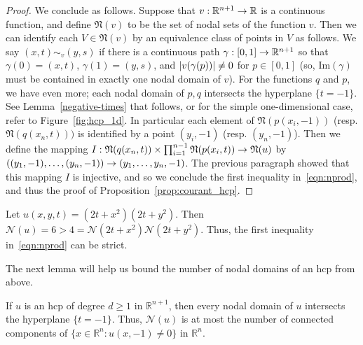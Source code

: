 \documentclass[AHL,Unicode,longabstracts,published]{cedram}
\newcommand{\R}{\mathbb{R}}
\newcommand{\ra}{\to}
\newcommand{\abs}[1]{\left \lvert #1 \right \rvert}
\renewcommand{\Im}{\mathrm{Im}}
\newcommand{\fkN}{\mathfrak{N}}
\newcommand{\nodal}{\mathcal{N}}
\renewcommand*{\to}{\mathchoice{\longrightarrow}{\rightarrow}{\rightarrow}{\rightarrow}}
\let\originalleft\left
\let\originalright\right
\renewcommand{\left}{\mathopen{}\mathclose\bgroup\originalleft}
\renewcommand{\right}{\aftergroup\egroup\originalright}
\newcommand{\R}{\mathbb{R}}
\begin{document}
\begin{proof}
{We conclude as follows. Suppose that $v:\R^{n+1} \ra \R$ is a continuous function, and define $\fkN(v)$ to be the set of nodal sets of the function $v$. Then we can identify each $V \in \fkN(v)$ by an equivalence class of points in $V$ as follows. We say $(x,t) \sim_v (y,s)$ if there is a continuous path $\gamma:[0,1] \ra \R^{n+1}$ so that $\gamma(0) = (x,t)$, $\gamma(1) = (y,s)$, and $\abs{v(\gamma(p))} \ne 0$ for $p \in [0,1]$ (so, $\Im(\gamma)$ must be contained in exactly one nodal domain of $v$). For the functions $q$ and $p$, we have even more; each nodal domain of $p, q$ intersects the hyperplane $\{t = -1\}$. See Lemma~\ref{negative-times} that follows, or for the simple one-dimensional case, refer to Figure~\ref{fig:hcp_1d}. In particular each element of $\fkN(p(x_i, -1))$ (resp. $\fkN(q(x_n, t)))$ is identified by a point $(y_i, -1)$ (resp. $(y_n, -1)$). Then we define the mapping $I: \fkN(q(x_n,t)) \times \prod_{i=1}^{n-1} \fkN(p(x_i, t)) \ra \fkN(u)$ by $((y_1, -1), \dots, (y_n, -1)) \ra (y_1, \dots, y_n, -1)$. The previous paragraph showed that this mapping $I$ is injective, and so we conclude the first inequality in~\eqref{eqn:nprod}, and thus the proof of Proposition~\ref{prop:courant_hcp}.}
\end{proof}

\begin{exam}
Let $u(x,y,t)=(2t+x^2)(2t+y^2)$. Then $\nodal(u)=6>4=\nodal(2t+x^2)\nodal(2t+y^2)$. Thus, the first inequality in~\eqref{eqn:nprod} can be strict.
\end{exam}

The next lemma will help us bound the number of nodal domains of an hcp from above.

\begin{lemm}\label{negative-times}
If $u$ is an hcp of degree $d\geq 1$ in $\R^{n+1}$, then every nodal domain of $u$ intersects the hyperplane $\{t=-1\}$. Thus, $\nodal(u)$ is at most the number of connected components of $\{x\in\R^n:u(x,-1)\neq 0\}$ in $\R^n$.
\end{lemm}
\end{document}
